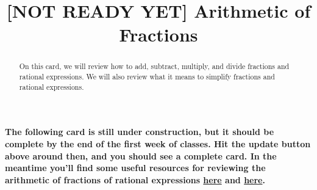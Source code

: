 \documentclass{ximera}
\title[Dig-In:]{[NOT READY YET] Arithmetic of Fractions}
\begin{document}
\begin{abstract}
On this card, we will review how to add, subtract, multiply, and divide fractions and rational expressions.  We will also review what it means to simplify fractions and rational expressions.
\end{abstract}
\maketitle

\textbf{The following card is still under construction, but it should be complete by the end of the first week of classes.  Hit the update button above around then, and you should see a complete card.  In the meantime you'll find some useful resources for reviewing the arithmetic of fractions of rational expressions \href{https://www.khanacademy.org/math/arithmetic/fraction-arithmetic}{here} and \href{https://www.khanacademy.org/math/algebra2/rational-expressions-equations-and-functions}{here}.}
\end{document}

